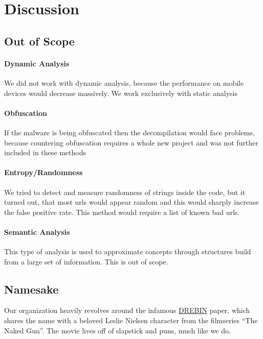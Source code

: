 \section{Discussion}
\subsection{Out of Scope}\label{out-of-scope}

\paragraph{Dynamic Analysis}\label{dynamic-analysis}

We did not work with dynamic analysis, because the performance on mobile
devices would decrease massively. We work exclusively with static
analysis

\paragraph{Obfuscation}\label{obfuscation}

If the malware is being obfuscated then the decompilation would face
problems, because countering obfuscation requires a whole new project
and was not further included in these methods

\paragraph{Entropy/Randomness}\label{entropyrandomness}

We tried to detect and measure randomness of strings inside the code,
but it turned out, that most urls would appear random and this would
sharply increase the false positive rate. This method would require a
list of known bad urls.

\paragraph{Semantic Analysis}\label{semantic-analysis}

This type of analysis is used to approximate concepts through structures
build from a large set of information. This is out of scope.

\subsection{Namesake}\label{namesake}

Our organization heavily revolves around the infamous
\href{https://www.tu-braunschweig.de/Medien-DB/sec/pubs/2014-ndss.pdf}{DREBIN}
paper, which shares the name with a beloved Leslie Nielsen character
from the filmseries ``The Naked Gun''. The movie lives off of slapstick
and puns, much like we do.